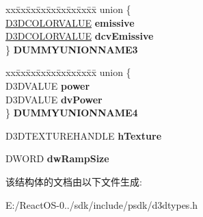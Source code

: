 \begin{DoxyCompactItemize}
\begin{tabbing}
\end{tabbing}\item 
\mbox{\label{struct___d3_d_m_a_t_e_r_i_a_l_a7bc6907597983cfbb454abbb8512256b}} 
\begin{tabbing}
xx\=xx\=xx\=xx\=xx\=xx\=xx\=xx\=xx\=\kill
union \{\\
\>\hyperlink{struct___d3_d_c_o_l_o_r_v_a_l_u_e}{D3DCOLORVALUE} {\bfseries emissive}\\
\>\hyperlink{struct___d3_d_c_o_l_o_r_v_a_l_u_e}{D3DCOLORVALUE} {\bfseries dcvEmissive}\\
\} {\bfseries DUMMYUNIONNAME3}\\

\end{tabbing}\item 
\mbox{\label{struct___d3_d_m_a_t_e_r_i_a_l_a72cf8d54158497c3085b41621e2c5a45}} 
\begin{tabbing}
xx\=xx\=xx\=xx\=xx\=xx\=xx\=xx\=xx\=\kill
union \{\\
\>D3DVALUE {\bfseries power}\\
\>D3DVALUE {\bfseries dvPower}\\
\} {\bfseries DUMMYUNIONNAME4}\\

\end{tabbing}\item 
\mbox{\label{struct___d3_d_m_a_t_e_r_i_a_l_ade102d690ac6ead151fad1acc67628bd}} 
D3\+D\+T\+E\+X\+T\+U\+R\+E\+H\+A\+N\+D\+LE {\bfseries h\+Texture}
\item 
\mbox{\label{struct___d3_d_m_a_t_e_r_i_a_l_a3ad1690a22703a3e6d772e154e3fc153}} 
D\+W\+O\+RD {\bfseries dw\+Ramp\+Size}
\end{DoxyCompactItemize}


该结构体的文档由以下文件生成\+:\begin{DoxyCompactItemize}
\item 
E\+:/\+React\+O\+S-\/0../sdk/include/psdk/d3dtypes.\+h\end{DoxyCompactItemize}
